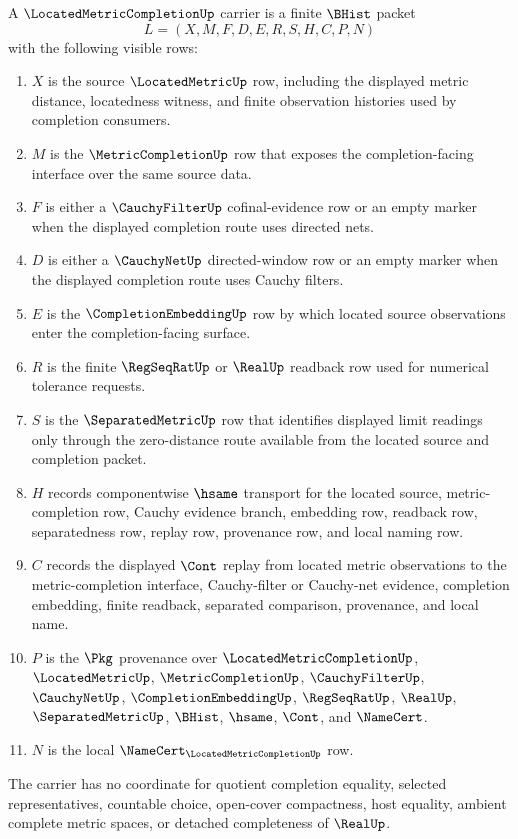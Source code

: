 \begin{definition}
\label{def:located-metric-completion-carrier}
A $\LocatedMetricCompletionUp$ carrier is a finite $\BHist$ packet
$$
L=(X,M,F,D,E,R,S,H,C,P,N)
$$
with the following visible rows:
\begin{enumerate}
\item $X$ is the source $\LocatedMetricUp$ row, including the displayed metric distance, locatedness witness, and finite observation histories used by completion consumers.
\item $M$ is the $\MetricCompletionUp$ row that exposes the completion-facing interface over the same source data.
\item $F$ is either a $\CauchyFilterUp$ cofinal-evidence row or an empty marker when the displayed completion route uses directed nets.
\item $D$ is either a $\CauchyNetUp$ directed-window row or an empty marker when the displayed completion route uses Cauchy filters.
\item $E$ is the $\CompletionEmbeddingUp$ row by which located source observations enter the completion-facing surface.
\item $R$ is the finite $\RegSeqRatUp$ or $\RealUp$ readback row used for numerical tolerance requests.
\item $S$ is the $\SeparatedMetricUp$ row that identifies displayed limit readings only through the zero-distance route available from the located source and completion packet.
\item $H$ records componentwise $\hsame$ transport for the located source, metric-completion row, Cauchy evidence branch, embedding row, readback row, separatedness row, replay row, provenance row, and local naming row.
\item $C$ records the displayed $\Cont$ replay from located metric observations to the metric-completion interface, Cauchy-filter or Cauchy-net evidence, completion embedding, finite readback, separated comparison, provenance, and local name.
\item $P$ is the $\Pkg$ provenance over $\LocatedMetricCompletionUp$, $\LocatedMetricUp$, $\MetricCompletionUp$, $\CauchyFilterUp$, $\CauchyNetUp$, $\CompletionEmbeddingUp$, $\RegSeqRatUp$, $\RealUp$, $\SeparatedMetricUp$, $\BHist$, $\hsame$, $\Cont$, and $\NameCert$.
\item $N$ is the local $\NameCert_{\LocatedMetricCompletionUp}$ row.
\end{enumerate}
The carrier has no coordinate for quotient completion equality, selected representatives, countable choice, open-cover compactness, host equality, ambient complete metric spaces, or detached completeness of $\RealUp$.
\end{definition}

